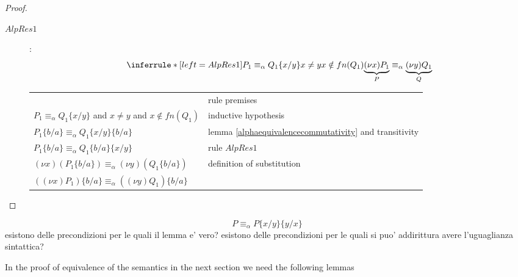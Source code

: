 \begin{lemma}
\begin{proof}
\begin{description}
\begin{description}
	  \item[$AlpRes1$]:
	    \[\inferrule*[left=AlpRes1]{
		P_{1}\equiv_{\alpha}Q_{1}\{x/y\}
	      \\
		x\neq y
	      \\
		x\notin fn(Q_{1})
	    }{
	      \underbrace{(\nu x)P_{1}}_{P}\equiv_{\alpha}\underbrace{(\nu y)Q_{1}}_{Q}
	    }\]
	    \begin{center}
	      \begin{tabular}{ll}
		  &
		    rule premises
		\\
		    $P_{1}\equiv_{\alpha}Q_{1}\{x/y\}$ and $x\neq y$ and $x\notin fn(Q_{1})$
		  &
		    inductive hypothesis
		\\
		    $P_{1}\{b/a\}\equiv_{\alpha} Q_{1}\{x/y\}\{b/a\}$
		  &
		    lemma \ref{alphaequivalencecommutativity} and transitivity
		\\
		    $P_{1}\{b/a\}\equiv_{\alpha} Q_{1}\{b/a\}\{x/y\}$
		  &
		    rule $AlpRes1$
		\\
		    $(\nu x)(P_{1}\{b/a\})\equiv_{\alpha} (\nu y)(Q_{1}\{b/a\})$
		  &
		    definition of substitution
		\\
		    $((\nu x)P_{1})\{b/a\}\equiv_{\alpha} ((\nu y)Q_{1})\{b/a\}$
		  &
		\\
	      \end{tabular}
	    \end{center}
	\end{description}
    \end{description}
  \end{proof}
\end{lemma}


\begin{lemma}
  \[
    P\equiv_{\alpha} P \{x/y\}\{y/x\}
  \]
  esistono delle precondizioni per le quali il lemma e' vero? esistono delle precondizioni per le quali si puo' addirittura avere l'uguaglianza sintattica?
\end{lemma}


In the proof of equivalence of the semantics in the next section we need the following lemmas


